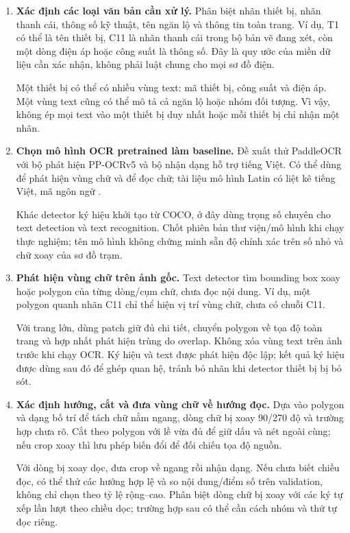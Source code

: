 \documentclass[11pt,a4paper]{article}
\newcommand{\code}[1]{\texttt{\detokenize{#1}}}
\begin{document}
\begin{enumerate}
  \item \textbf{Xác định các loại văn bản cần xử lý.}
  Phân biệt nhãn thiết bị, nhãn thanh cái, thông số kỹ thuật, tên ngăn lộ và thông tin toàn trang. Ví dụ, T1 có thể là tên thiết bị, C11 là nhãn thanh cái trong bộ bản vẽ đang xét, còn một dòng điện áp hoặc công suất là thông số. Đây là quy ước của miền dữ liệu cần xác nhận, không phải luật chung cho mọi sơ đồ điện.

  Một thiết bị có thể có nhiều vùng text: mã thiết bị, công suất và điện áp. Một vùng text cũng có thể mô tả cả ngăn lộ hoặc nhóm đối tượng. Vì vậy, không ép mọi text vào một thiết bị duy nhất hoặc mỗi thiết bị chỉ nhận một nhãn.

  \item \textbf{Chọn mô hình OCR pretrained làm baseline.}
  Đề xuất thử PaddleOCR với bộ phát hiện PP-OCRv5 và bộ nhận dạng hỗ trợ tiếng Việt. Có thể dùng \code{PP-OCRv5_server_det} để phát hiện vùng chữ \cite{paddledet} và \code{latin_PP-OCRv5_mobile_rec} để đọc chữ; tài liệu mô hình Latin có liệt kê tiếng Việt, mã ngôn ngữ \code{vi} \cite{paddlelatin}.

  Khác detector ký hiệu khởi tạo từ COCO, ở đây dùng trọng số chuyên cho text detection và text recognition. Chốt phiên bản thư viện/mô hình khi chạy thực nghiệm; tên mô hình không chứng minh sẵn độ chính xác trên số nhỏ và chữ xoay của sơ đồ trạm.

  \item \textbf{Phát hiện vùng chữ trên ảnh gốc.}
  Text detector tìm bounding box xoay hoặc polygon của từng dòng/cụm chữ, chưa đọc nội dung. Ví dụ, một polygon quanh nhãn C11 chỉ thể hiện vị trí vùng chữ, chưa có chuỗi C11.

  Với trang lớn, dùng patch giữ đủ chi tiết, chuyển polygon về tọa độ toàn trang và hợp nhất phát hiện trùng do overlap. Không xóa vùng text trên ảnh trước khi chạy OCR. Ký hiệu và text được phát hiện độc lập; kết quả ký hiệu được dùng sau đó để ghép quan hệ, tránh bỏ nhãn khi detector thiết bị bị bỏ sót.

  \item \textbf{Xác định hướng, cắt và đưa vùng chữ về hướng đọc.}
  Dựa vào polygon và dạng bố trí để tách chữ nằm ngang, dòng chữ bị xoay 90/270 độ và trường hợp chưa rõ. Cắt theo polygon với lề vừa đủ để giữ dấu và nét ngoài cùng; nếu crop xoay thì lưu phép biến đổi để đối chiếu tọa độ nguồn.

  Với dòng bị xoay dọc, đưa crop về ngang rồi nhận dạng. Nếu chưa biết chiều đọc, có thể thử các hướng hợp lệ và so nội dung/điểm số trên validation, không chỉ chọn theo tỷ lệ rộng--cao. Phân biệt dòng chữ bị xoay với các ký tự xếp lần lượt theo chiều dọc; trường hợp sau có thể cần cách nhóm và thứ tự đọc riêng.


\end{enumerate}
\end{document}
